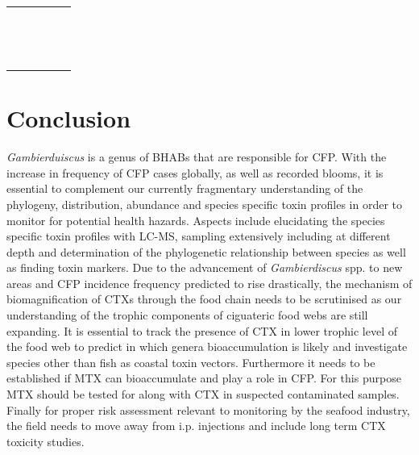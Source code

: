 \documentclass[12pt]{article}
\begin{document}
\begin{longtable}{  | p{2cm} | p{3cm} | p{4.5cm}  | p{2cm} | p{3cm}  | }
  & \emph{} &  &  & \\
  &  \emph{} &  &  & \\
  & \emph{}  &  &  & \\
  & \emph{} &  &  & \\
  &  \emph{} &  &  & \\
  & \emph{}  &  &  & \\
  & \emph{} &  &  & \\
  &  \emph{} &  &  & \\
  & \emph{}  &  &  & \\
  & \emph{} &  &  & \\
  &  \emph{} &  &  & \\
  & \emph{}  &  &  & \\
  & \emph{} &  &  & \\
\end{longtable}

\section{Conclusion}
\emph{Gambierduiscus} is a genus of BHABs that are responsible for CFP. With the increase in frequency of CFP cases globally, as well as recorded blooms, it is essential to complement our currently fragmentary understanding of the phylogeny, distribution, abundance and species specific toxin profiles in order to monitor for potential health hazards. Aspects include elucidating the species specific toxin profiles with LC-MS, sampling extensively including at different depth and determination of the phylogenetic relationship between species as well as finding toxin markers.
Due to the  advancement of \emph{Gambierdiscus} spp. to new areas and CFP incidence frequency predicted to rise drastically, the mechanism of biomagnification of CTXs through the food chain needs to be scrutinised as our understanding of the trophic components of ciguateric food webs are still expanding.
It is essential to track the presence of CTX in lower trophic level of the food web to predict in which genera bioaccumulation is likely \cite{mak2013pacific} and investigate species other than fish as coastal toxin vectors. Furthermore it needs to be established if MTX can bioaccumulate and play a role in CFP. For this purpose MTX should be tested for along with CTX in suspected contaminated samples.
Finally for proper risk assessment relevant to monitoring by the seafood industry, the field needs to move away from i.p. injections and include long term CTX toxicity studies.


\newpage



\end{document}
